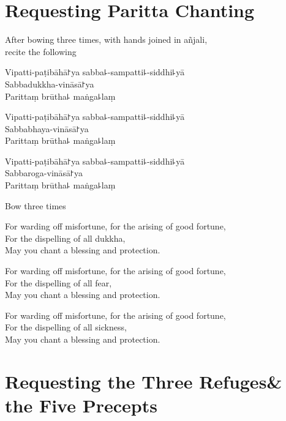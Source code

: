 \clearpage
\chapter{Requesting Paritta Chanting}%


\begin{instruction}
  After bowing three times, with hands joined in añjali,\\
  recite the following
\end{instruction}

Vipatti-paṭibāhā꜓ya sabba꜕-sampatti꜕-siddhi꜕yā\\
Sabbadukkha-vināsā꜓ya\\
Parittaṃ brūtha꜕ maṅga꜕laṃ

Vipatti-paṭibāhā꜓ya sabba꜕-sampatti꜕-siddhi꜕yā\\
Sabbabhaya-vināsā꜓ya\\
Parittaṃ brūtha꜕ maṅga꜕laṃ

Vipatti-paṭibāhā꜓ya sabba꜕-sampatti꜕-siddhi꜕yā\\
Sabbaroga-vināsā꜓ya\\
Parittaṃ brūtha꜕ maṅga꜕laṃ

\begin{instruction}
  Bow three times
\end{instruction}

\begin{english}
For warding off misfortune, for the arising of good fortune,\\
For the dispelling of all dukkha,\\
May you chant a blessing and protection.

For warding off misfortune, for the arising of good fortune,\\
For the dispelling of all fear,\\
May you chant a blessing and protection.

For warding off misfortune, for the arising of good fortune,\\
For the dispelling of all sickness,\\
May you chant a blessing and protection.
\end{english}

\setlength{\englishIndent}{\leaderIndent}

\clearpage
\chapter[Three Refuges \& the Five Precepts]{Requesting the Three Refuges\newline \& the Five Precepts}%

